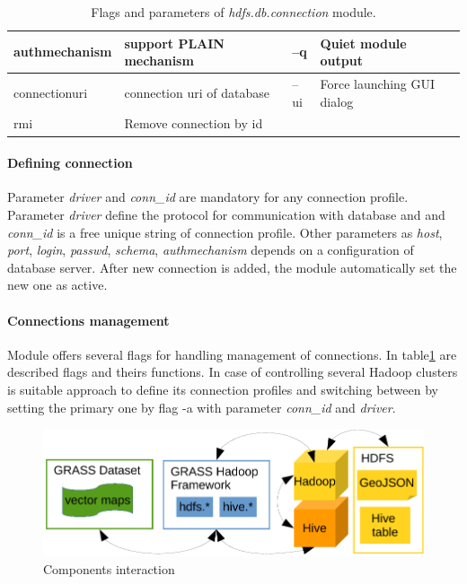 \documentclass[a4paper,12pt,oneside]{report}
\begin{document}
\begin{table}[!htbp]
\begin{scriptsize}
\begin{tabular}{@{}|l|l||l|l|@{}}
authmechanism & support PLAIN mechanism                                                                                   & --q   & Quiet module output                                                                     \\ \midrule
connectionuri & connection uri of database                                                                                & --ui  & Force launching GUI dialog                                                              \\ \midrule
rmi           & Remove connection by id                                                                                   &       &                                                                                         \\ \bottomrule
\end{tabular}
\caption{Flags and parameters of \textit{hdfs.db.connection} module.}
\label{tbl:connections}
\end{scriptsize}
\end{table}

\paragraph{Defining connection} Parameter \textit{driver} and \textit{conn\_id} are mandatory for any connection profile. Parameter \textit{driver} define the protocol for communication with database and  and \textit{conn\_id} is a free unique string of connection profile. Other parameters as \textit{host}, \textit{port}, \textit{login}, \textit{passwd}, \textit{schema}, \textit{authmechanism} depends on a configuration of database server. After new connection is added, the module automatically set the new one as active. 

\paragraph{Connections management} Module offers several flags for handling management of connections. In table\ref{tbl:connections} are described flags and theirs functions. In case of controlling several Hadoop clusters is suitable  approach to define its connection profiles  and switching between by setting the primary one by flag -a with parameter \textit{conn\_id} and \textit{driver}.

 \begin{figure}[!htbp]
    \centering
    \includegraphics[width=1\textwidth]{./img/ghf_overview.pdf}
    \caption[Components interaction]{\centering Components interaction}
 \end{figure} 
\end{document}
